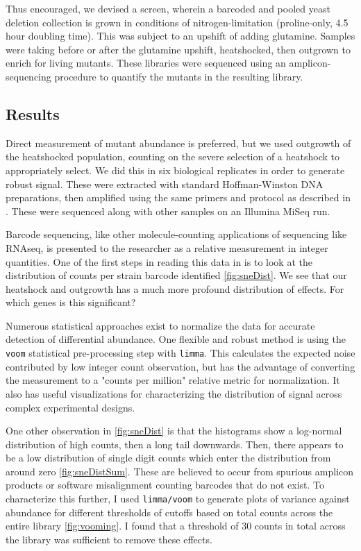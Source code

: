 Thus encouraged, we devised a screen, wherein a barcoded and pooled 
yeast deletion collection
is grown in conditions of nitrogen-limitation (proline-only, 4.5 hour
doubling time). This was subject to an upshift of adding glutamine.
Samples were taking before or after the glutamine upshift,
heatshocked, then outgrown to enrich for living mutants.
These libraries were sequenced using an amplicon-sequencing procedure
to quantify the mutants in the resulting library.

\subsection{Results}

Direct measurement of mutant abundance is preferred, but we used
outgrowth of the heatshocked population, counting on the severe
selection of a heatshock to appropriately select.
We did this in six biological replicates in order to generate robust
signal.
These were extracted with standard Hoffman-Winston DNA preparations,
then amplified using the same primers and protocol as described in
\parencite{robinson2013design}. These were sequenced along with other
samples on an Illumina MiSeq run.

Barcode sequencing, like other molecule-counting applications of
sequencing like RNAseq, is presented to the researcher as a relative 
measurement in integer quantities. 
One of the first steps in reading this data in is to look at the
distribution of counts per strain barcode identified
\autoref{fig:sneDist}.
We see that our heatshock and outgrowth has a much more profound
distribution of effects.
For which genes is this significant?


Numerous statistical approaches
exist to normalize the data for accurate detection of differential
abundance. One flexible and robust method is using the \texttt{voom}
statistical pre-processing step with \texttt{limma}. 
This calculates
the expected noise contributed by low integer count observation, but
has the advantage of converting the measurement to a "counts per
million" relative metric for normalization. 
It also has useful visualizations for characterizing the 
distribution of signal across complex experimental designs.

One other observation in \autoref{fig:sneDist} is that the histograms
show a log-normal distribution of high counts, then a long tail
downwards. 
Then, there appears to be a low distribution of single digit counts
which enter the distribution from around zero \autoref{fig:sneDistSum}.
These are believed to occur from spurious amplicon products or
software misalignment counting barcodes that do not exist.
To characterize this further, I used \texttt{limma/voom} to generate
plots of variance against abundance for different thresholds of
cutoffs based on total counts across the entire library
\autoref{fig:vooming}.
I found that a threshold of 30 counts in total across the library
was sufficient to remove these effects.

